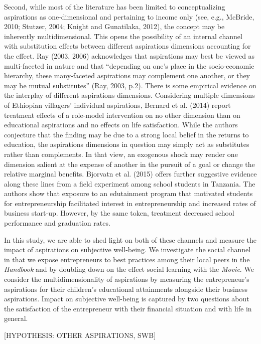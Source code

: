 \documentclass[11.5pt]{article}
\begin{document}
Second, while most of the literature has been limited to conceptualizing aspirations as one-dimensional and pertaining to income only (see, e.g., McBride, 2010; Stutzer, 2004; Knight and Gunatilaka, 2012), the concept may be inherently multidimensional. This opens the possibility of an internal channel with substitution effects between different aspirations dimensions accounting for the effect. Ray (2003, 2006) acknowledges that aspirations may best be viewed as multi-faceted in nature and that ``depending on one's place in the socio-economic hierarchy, these many-faceted aspirations may complement one another, or they may be mutual substitutes'' (Ray, 2003, p.2). There is some empirical evidence on the interplay of different aspirations dimensions. Considering multiple dimensions of Ethiopian villagers' individual aspirations, Bernard et al. (2014) report treatment effects of a role-model intervention on no other dimension than on educational aspirations and no effects on life satisfaction. While the authors conjecture that the finding may be due to a strong local belief in the returns to education, the aspirations dimensions in question may simply act as substitutes rather than complements. In that view, an exogenous shock may render one dimension salient at the expense of another in the pursuit of a goal or change the relative marginal benefits. Bjorvatn et al. (2015) offers further suggestive evidence along these lines from a field experiment among school students in Tanzania. The authors show that exposure to an edutainment program that motivated students for entrepreneurship facilitated interest in entrepreneurship and increased rates of business start-up. However, by the same token, treatment decreased school performance and graduation rates.

In this study, we are able to shed light on both of these channels and measure the impact of aspirations on subjective well-being. We investigate the social channel in that we expose entrepreneurs to best practices among their local peers in the \emph{Handbook} and by doubling down on the effect social learning with the \emph{Movie}. We consider the multidimensionality of aspirations by measuring the entrepreneur's aspirations for their children's educational attainments alongside their business aspirations. Impact on subjective well-being is captured by two questions about the satisfaction of the entrepreneur with their financial situation and with life in general.

[HYPOTHESIS: OTHER ASPIRATIONS, SWB]
\end{document}
